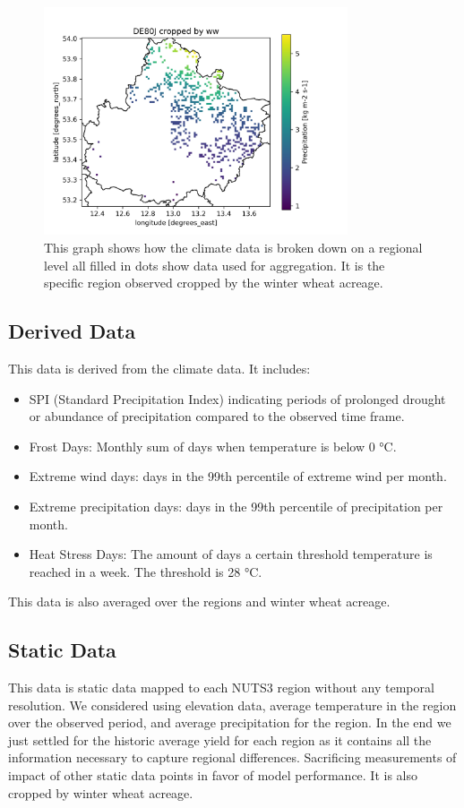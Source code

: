 \documentclass{article}
\begin{document}
\begin{figure}[H]
	\centering
	\includegraphics[width=0.8\textwidth]{./plots/DE80J_cropped_by_ww.png}
	\caption{\label{fig:DE80J_cropped_example}This graph shows how the climate data is broken down on a regional level all filled in dots show data used for aggregation. It is the specific region observed cropped by the winter wheat acreage.}
\end{figure}

\subsection{Derived Data}
This data is derived from the climate data. It includes:
\begin{itemize}
	\item SPI (Standard Precipitation Index) indicating periods of prolonged drought or abundance of precipitation compared to the observed time frame.
	\item Frost Days: Monthly sum of days when temperature is below 0 °C.
	\item Extreme wind days: days in the 99th percentile of extreme wind per month.
	\item Extreme precipitation days: days in the 99th percentile of precipitation per month.
	\item Heat Stress Days: The amount of days a certain threshold temperature is reached in a week. The threshold is 28 °C.
\end{itemize}
This data is also averaged over the regions and winter wheat acreage.
\subsection{Static Data}
This data is static data mapped to each NUTS3 region without any temporal resolution. We considered using elevation data, average temperature in the region over the observed period, and average precipitation for the region. In the end we just settled for the historic average yield for each region as it contains all the information necessary to capture regional differences. Sacrificing measurements of impact of other static data points in favor of model performance. It is also cropped by winter wheat acreage.
\end{document}

